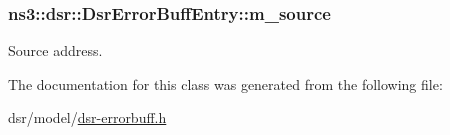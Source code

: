 \subsubsection[{\texorpdfstring{m\+\_\+source}{m_source}}]{ ns3\+::dsr\+::\+Dsr\+Error\+Buff\+Entry\+::m\+\_\+source\hspace{0.3cm}{\ttfamily [private]}}\hypertarget{classns3_1_1dsr_1_1DsrErrorBuffEntry_aa27198f2b94226c5a1a5fa30da020e9b}{}\label{classns3_1_1dsr_1_1DsrErrorBuffEntry_aa27198f2b94226c5a1a5fa30da020e9b}


Source address. 



The documentation for this class was generated from the following file\+:\begin{DoxyCompactItemize}
\item 
dsr/model/\hyperlink{dsr-errorbuff_8h}{dsr-\/errorbuff.\+h}\end{DoxyCompactItemize}
